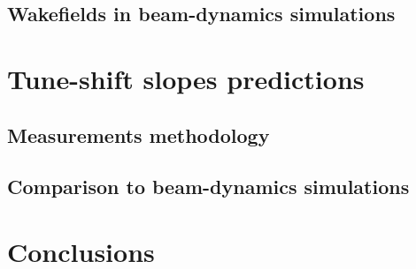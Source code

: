 \subsection{Wakefields in beam-dynamics simulations}

\section{Tune-shift slopes predictions}

\subsection{Measurements methodology}

\subsection{Comparison to beam-dynamics simulations}

\section{Conclusions}


